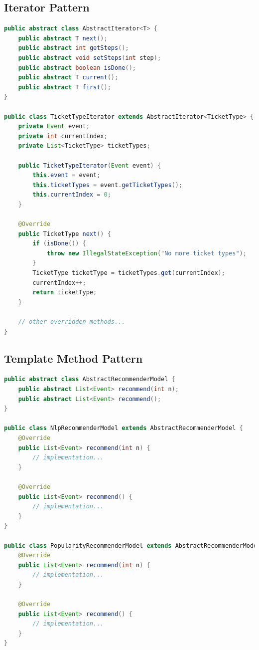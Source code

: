 \documentclass{article}
\begin{document}
\subsection{Iterator Pattern}
\begin{lstlisting}[language=Java, caption={Iterator Pattern for Ticket Types}]
public abstract class AbstractIterator<T> {
    public abstract T next();
    public abstract int getSteps();
    public abstract void setSteps(int step);
    public abstract boolean isDone();
    public abstract T current();
    public abstract T first();
}

public class TicketTypeIterator extends AbstractIterator<TicketType> {
    private Event event;
    private int currentIndex;
    private List<TicketType> ticketTypes;
    
    public TicketTypeIterator(Event event) {
        this.event = event;
        this.ticketTypes = event.getTicketTypes();
        this.currentIndex = 0;
    }

    @Override
    public TicketType next() {
        if (isDone()) {
            throw new IllegalStateException("No more ticket types");
        }
        TicketType ticketType = ticketTypes.get(currentIndex);
        currentIndex++;
        return ticketType;
    }

    // other overridden methods...
}
\end{lstlisting}

\subsection{Template Method Pattern}
\begin{lstlisting}[language=Java, caption={Template Method for Recommender Models}]
public abstract class AbstractRecommenderModel {
    public abstract List<Event> recommend(int n);
    public abstract List<Event> recommend();
}

public class NlpRecommenderModel extends AbstractRecommenderModel {
    @Override
    public List<Event> recommend(int n) {
        // implementation...
    }

    @Override
    public List<Event> recommend() {
        // implementation...
    }
}

public class PopularityRecommenderModel extends AbstractRecommenderModel {
    @Override
    public List<Event> recommend(int n) {
        // implementation...
    }

    @Override
    public List<Event> recommend() {
        // implementation...
    }
}
\end{lstlisting}
\end{document}
